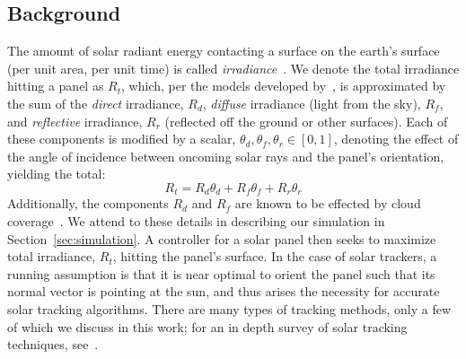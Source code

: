 \documentclass{article}
\begin{document}
\subsection{Background}

The amount of solar radiant energy contacting a surface on the earth's surface (per unit area, per unit time) is called {\it irradiance}~\cite{goswami2000principles}.  We denote the total irradiance hitting a panel as $R_t$, which, per the models developed by~\citet{kamali2006estimating}, is approximated by the sum of the {\it direct} irradiance, $R_d$, {\it diffuse} irradiance (light from the sky), $R_f$, and {\it reflective} irradiance, $R_r$ (reflected off the ground or other surfaces). Each of these components is modified by a scalar, $\theta_d, \theta_f, \theta_r \in [0,1]$, denoting the effect of the angle of incidence between oncoming solar rays and the panel's orientation, yielding the total:
\begin{equation}
R_t = R_d \theta_d + R_f \theta_f + R_r \theta_r
\label{eq:total_rads}
\end{equation}
Additionally, the components $R_d$ and $R_f$ are known to be effected by cloud coverage~\cite{li2004overcast,pfister2003cloud,tzoumanikas2016effect}. We attend to these details in describing our simulation in Section~\ref{sec:simulation}. A controller for a solar panel then seeks to maximize total irradiance, $R_t$, hitting the panel's surface. In the case of solar trackers, a running assumption is that it is near optimal to orient the panel such that its normal vector is pointing at the sun, and thus arises the necessity for accurate solar tracking algorithms. There are many types of tracking methods, only a few of which we discuss in this work; for an in depth survey of solar tracking techniques, see~\citet{mousazadeh2009review}.

\end{document}
